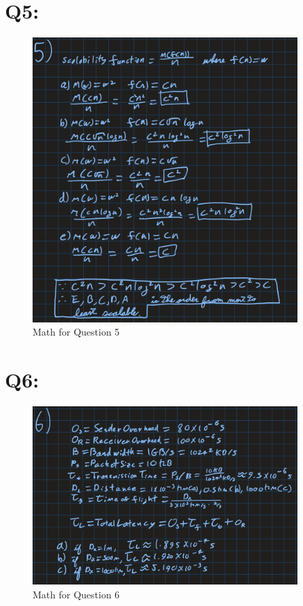\documentclass[11pt]{article}
\begin{document}
\newpage

\section*{Q5:}

\begin{figure}[H]
\centering
    \includegraphics[width=0.9\textwidth]{./images/q5.jpg}
\caption{Math for Question 5}
\label{fig:q5}
\end{figure}

\newpage

\section*{Q6:}

\begin{figure}[H]
\centering
    \includegraphics[width=0.9\textwidth]{./images/q6.jpg}
\caption{Math for Question 6}
\label{fig:q6}
\end{figure}
\end{document}
